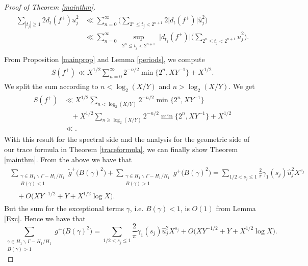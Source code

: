 \documentclass[a4paper,11pt]{amsart}
\theoremstyle{definition}
\begin{document}
\begin{proof}[Proof of Theorem \ref{mainthm}]
\begin{align}
    \begin{split}
        \sum_{|t_j|\ge 1}2d_t(f^{+})\hat{u}_j^2  &\ll\sum_{n=0}^{\infty}\Bigg(\sum_{2^n\le t_j<2^{n+1}}2\big|d_t(f^{+})\big|\hat{u}_j^2\Bigg)\\
        &\ll \sum_{n=0}^{\infty}\sup_{\substack{2^n\le t_j<2^{n+1}}}\big|d_{t_j}(f^{+})\big|\Bigg( \sum_{2^n\le t_j<2^{n+1}}\hat{u}_j^2\Bigg).
    \end{split}
\end{align}
From Proposition \ref{mainprop} and Lemma \ref{periods}, we compute
\begin{align}
    \begin{split}
        S(f^{+})\ll X^{1/2}\sum_{n=0}^{\infty} 2^{-n/2}\min\Big\{2^{n},XY^{-1}\Big\}+X^{1/2}.
    \end{split}
\end{align}
We split the sum according to $n<\log_2(X/Y)$ and $n>\log_2(X/Y)$. We get
\begin{align}\label{Sf++}
    \begin{split}
        S(f^{+})&\ll X^{1/2}\sum_{n<\log_2(X/Y)}2^{-n/2}\min\Big\{2^{n},XY^{-1}\Big\} \\
        &\quad+ X^{1/2}\sum_{n\ge \log_2(X/Y)}2^{-n/2}\min\Big\{2^{n},XY^{-1}\Big\}+X^{1/2} \\
        &\ll 
       .
    \end{split}
\end{align}
With this result for the spectral side and the analysis for the geometric side of our trace formula in Theorem \ref{traceformula}, we can finally show Theorem \ref{mainthm}.
From the above we have that 
\begin{align}
    \begin{split}
        \sum_{\substack{{\gamma \in H_1 \backslash \Gamma -H_1 /H_1} \\ B(\gamma)<1 }}\widetilde{g}^{+}\big(B(\gamma)^2\big)+\sum_{\substack{{\gamma \in H_1 \backslash \Gamma -H_1 /H_1} \\ B(\gamma)>1 }}g^{+}\big(B(\gamma)^2\big)=\sum_{1/2<s_j\le1}\frac{2}{\pi}\gamma_1(s_j)\hat{u}_j^2X^{s_j}\\
        \quad+O\Big(XY^{-1/2}+Y+X^{1/2}\log X\Big). \;
    \end{split}
\end{align}
But the sum for the exceptional terms $\gamma$, i.e. $B(\gamma)<1$, is $O(1)$ from Lemma \ref{Exc}. Hence we have that
$$\sum_{\substack{{\gamma \in H_1 \backslash \Gamma -H_1 /H_1} \\ B(\gamma)>1 }}g^{+}\big(B(\gamma)^2\big)=\sum_{1/2<s_j\le1}\frac{2}{\pi}\gamma_1(s_j)\hat{u}_j^2X^{s_j}+O\Big(XY^{-1/2}+Y+X^{1/2}\log X\Big).$$

\end{proof}
\end{document}
